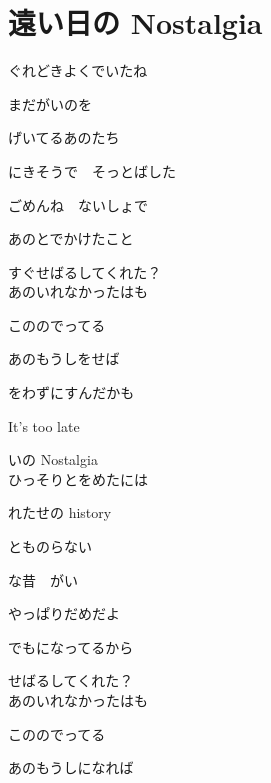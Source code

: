 \section{ 遠い日の Nostalgia}
\large{

ぐれどきよくでいたね

まだがいのを

げいてるあのたち

にきそうで　そっとばした

ごめんね　ないしょで

あのとでかけたこと

すぐせばるしてくれた？
\\

あのいれなかったはも

こののでってる

あのもうしをせば

をわずにすんだかも

It's too late

いの Nostalgia
\\

ひっそりとをめたには

れたせの history

とものらない

な昔　がい

やっぱりだめだよ

でもになってるから

せばるしてくれた？
\\

あのいれなかったはも

こののでってる

あのもうしになれば

}
